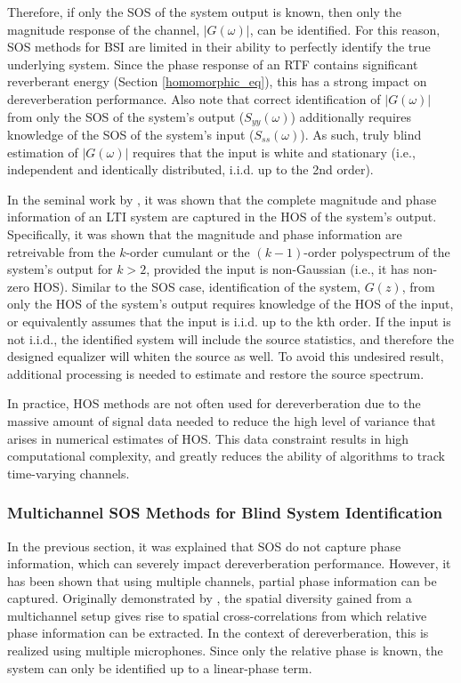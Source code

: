 \noindent
Therefore, if only the SOS of the system output is known, then only the magnitude response of the channel, $|G(\omega)|$, can be identified. For this reason, SOS methods for BSI are limited in their ability to perfectly identify the true underlying system. Since the phase response of an RTF contains significant reverberant energy (Section \ref{homomorphic_eq}), this has a strong impact on dereverberation performance. Also note that correct identification of $|G(\omega)|$ from only the SOS of the system's output ($S_{yy}(\omega)$) additionally requires knowledge of the SOS of the system's input ($S_{ss}(\omega)$). As such, truly blind estimation of $|G(\omega)|$ requires that the input is white and stationary (i.e., independent and identically distributed, i.i.d. up to the 2nd order).

In the seminal work by \cite{giannakis1989identification}, it was shown that the complete magnitude and phase information of an LTI system are captured in the HOS of the system's output. Specifically, it was shown that the magnitude and phase information are retreivable from the $k$-order cumulant or the $(k-1)$-order polyspectrum of the system's output for $k>2$, provided the input is non-Gaussian (i.e., it has non-zero HOS). Similar to the SOS case, identification of the system, $G(z)$, from only the HOS of the system's output requires knowledge of the HOS of the input, or equivalently assumes that the input is i.i.d. up to the kth order. If the input is not i.i.d., the identified system will include the source statistics, and therefore the designed equalizer will whiten the source as well. To avoid this undesired result, additional processing is needed to estimate and restore the source spectrum.

In practice, HOS methods are not often used for dereverberation due to the massive amount of signal data needed to reduce the high level of variance that arises in numerical estimates of HOS. This data constraint results in high computational complexity, and greatly reduces the ability of algorithms to track time-varying channels.
	
\subsubsection{Multichannel SOS Methods for Blind System Identification} \label{mc_sos_bsi}

In the previous section, it was explained that SOS do not capture phase information, which can severely impact dereverberation performance. However, it has been shown that using multiple channels, partial phase information can be captured. Originally demonstrated by \cite{slock1994blind}, the spatial diversity gained from a multichannel setup gives rise to spatial cross-correlations from which relative phase information can be extracted. In the context of dereverberation, this is realized using multiple microphones. Since only the relative phase is known, the system can only be identified up to a linear-phase term.

